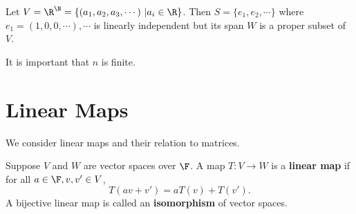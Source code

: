 \begin{eg}
    Let $V = \R^{\N} = \{(a_1, a_2, a_3, \cdots)\ | a_i \in  \R\} $. Then $S = \{e_1, e_2, \cdots\} $ where $e_1 = (1, 0, 0, \cdots), \cdots$ is linearly independent but its span $W$ is a proper subset of $V$. 
\end{eg}
\begin{explanation}
    It is important that $n$ is finite.
\end{explanation}

\section{Linear Maps}
We consider linear maps and their relation to matrices.
\begin{definition}
    Suppose $V$ and $W$ are vector spaces over $\F$. A map $T : V \to  W$ is a \textbf{linear map} if for all $a \in  \F, v, v' \in  V$, 
    \[
    T(av + v') = aT(v) + T(v').
    \] 
    A bijective linear map is called an \textbf{isomorphism} of vector spaces.
\end{definition}

